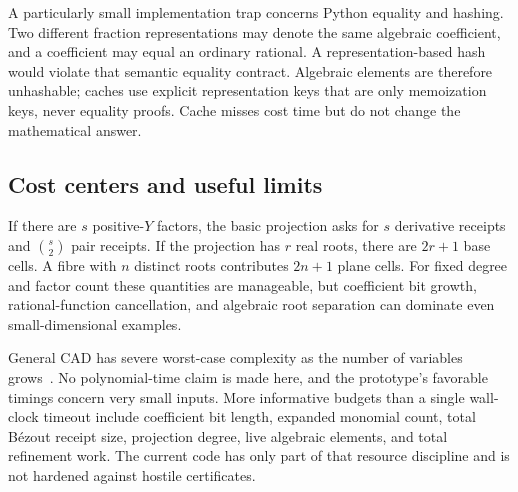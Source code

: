 A particularly small implementation trap concerns Python equality and hashing. Two different fraction representations may denote the same algebraic coefficient, and a coefficient may equal an ordinary rational. A representation-based hash would violate that semantic equality contract. Algebraic elements are therefore unhashable; caches use explicit representation keys that are only memoization keys, never equality proofs. Cache misses cost time but do not change the mathematical answer.

\subsection{Cost centers and useful limits}
If there are $s$ positive-$Y$ factors, the basic projection asks for $s$ derivative receipts and $\binom{s}{2}$ pair receipts. If the projection has $r$ real roots, there are $2r+1$ base cells. A fibre with $n$ distinct roots contributes $2n+1$ plane cells. For fixed degree and factor count these quantities are manageable, but coefficient bit growth, rational-function cancellation, and algebraic root separation can dominate even small-dimensional examples.

General CAD has severe worst-case complexity as the number of variables grows~\cite{england}. No polynomial-time claim is made here, and the prototype's favorable timings concern very small inputs. More informative budgets than a single wall-clock timeout include coefficient bit length, expanded monomial count, total B\'ezout receipt size, projection degree, live algebraic elements, and total refinement work. The current code has only part of that resource discipline and is not hardened against hostile certificates.
